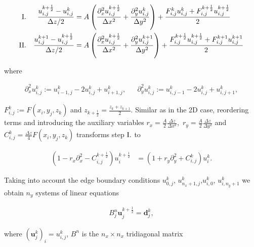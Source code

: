 \begin{align*}
\RN{1}. && \frac{u_{i,j}^{k+\frac{1}{2}} - u_{i,j}^{k}}{\Delta z/2} &=
A \left( \frac{\partial_x^2 u_{i,j}^{k+\frac{1}{2}}}{\Delta x^2}  + \frac{\partial_y^2 u_{i,j}^{k}}{\Delta y^2}  \right) + \frac{F_{i,j}^k u_{i,j}^{k} + F_{i,j}^{k+\frac{1}{2}} u_{i,j}^{k+\frac{1}{2}} }{2} \\
\RN{2}. && \frac{u_{i,j}^{k+1} - u_{i,j}^{k+\frac{1}{2}}}{\Delta z/2} &=
A \left(\frac{\partial_x^2 u_{i,j}^{k+\frac{1}{2}}}{\Delta x^2}  + \frac{\partial_y^2 u_{i,j}^{k+1}}{\Delta y^2}  \right) + \frac{F_{i,j}^{k+\frac{1}{2}} u_{i,j}^{k+\frac{1}{2}} + F_{i,j}^{k+1} u_{i,j}^{k+1} }{2} 
\end{align*}

{\centering 

where

}

\vspace{-1\baselineskip}

\begin{align*}
\partial_x^2 u_{i,j}^{k} := u_{i-1,j}^{k} - 2 u_{i,j}^{k} + u_{i+1,j}^{k}, && 
\partial_y^2 u_{i,j}^{k} := u_{i,j-1}^{k} - 2 u_{i,j}^{k} + u_{i,j+1}^{k},
\end{align*}

$F_{i,j}^{k} := F(x_i,y_j,z_k)$ and $z_{k+\frac{1}{2}} = \frac{z_{k} + z_{k+1}}{2}$. Similar as in the 2D case, reordering terms and introducing the auxiliary variables $r_x = \frac{A}{2} \frac{\Delta z}{ \Delta x^2}$, $\, r_y = \frac{A}{2} \frac{\Delta z}{ \Delta y^2}$ and $C_{i,j}^{k} = \frac{\Delta z}{4} F(x_i,y_j,z_{k})$ transforms step $\RN{1}.$ to

\begin{align} \label{eq:3D_finite_difference_equation}
( 1 - r_x \partial_x^2 - C_{i,j}^{k+\frac{1}{2}} ) u_{i}^{k+\frac{1}{2}} 
& = ( 1 + r_y \partial_y^2 + C_{i,j}^{k} ) u_{i}^{k}.
\end{align}

Taking into account the edge boundary conditions $u_{0,j}^k$, $u_{n_x+1,j}^{k}$,$u_{i,0}^k$, $u_{i,n_y+1}^{k}$ we obtain $n_y$ systems of linear equations

\begin{align} \label{eq:FD2DMatrixEquation}
B^n_j \boldsymbol u^{k+\frac{1}{2}}_j = \boldsymbol d^k_j,
\end{align}

where $\left(\boldsymbol u^{k}_j\right)_i = u_{i,j}^{k}$, $B^n$ is the $n_x \times n_x$ tridiagonal matrix

